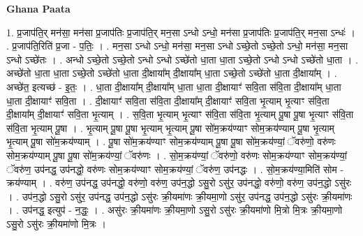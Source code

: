 \documentclass[17pt]{extarticle}
\begin{document}
\textbf{Ghana Paata } \newline

1. प्र॒जाप॑ति॒र् मन॑सा॒ मन॑सा प्र॒जाप॑तिः प्र॒जाप॑ति॒र् मन॒सा ऽन्धो ऽन्धो॒ मन॑सा प्र॒जाप॑तिः प्र॒जाप॑ति॒र् मन॒सा ऽन्धः॑ । . प्र॒जाप॑ति॒रिति॑ प्र॒जा - प॒तिः॒ । . मन॒सा ऽन्धो ऽन्धो॒ मन॑सा॒ मन॒सा ऽन्धो ऽच्छे॒तो ऽच्छे॒तो ऽन्धो॒ मन॑सा॒ मन॒सा ऽन्धो ऽच्छे॑तः । . अन्धो ऽच्छे॒तो ऽच्छे॒तो ऽन्धो ऽन्धो ऽच्छे॑तो धा॒ता धा॒ता ऽच्छे॒तो ऽन्धो ऽन्धो ऽच्छे॑तो धा॒ता । . अच्छे॑तो धा॒ता धा॒ता ऽच्छे॒तो ऽच्छे॑तो धा॒ता दी॒क्षाया᳚म् दी॒क्षाया᳚म् धा॒ता ऽच्छे॒तो ऽच्छे॑तो धा॒ता दी॒क्षाया᳚म् । . अच्छे॑त॒ इत्यच्छ॑ - इ॒तः॒ । . धा॒ता दी॒क्षाया᳚म् दी॒क्षाया᳚म् धा॒ता धा॒ता दी॒क्षायाꣳ॑ सवि॒ता स॑वि॒ता दी॒क्षाया᳚म् धा॒ता धा॒ता दी॒क्षायाꣳ॑ सवि॒ता । . दी॒क्षायाꣳ॑ सवि॒ता स॑वि॒ता दी॒क्षाया᳚म् दी॒क्षायाꣳ॑ सवि॒ता भृ॒त्याम् भृ॒त्याꣳ स॑वि॒ता दी॒क्षाया᳚म् दी॒क्षायाꣳ॑ सवि॒ता भृ॒त्याम् । . स॒वि॒ता भृ॒त्याम् भृ॒त्याꣳ स॑वि॒ता स॑वि॒ता भृ॒त्याम् पू॒षा पू॒षा भृ॒त्याꣳ स॑वि॒ता स॑वि॒ता भृ॒त्याम् पू॒षा । . भृ॒त्याम् पू॒षा पू॒षा भृ॒त्याम् भृ॒त्याम् पू॒षा सो॑म॒क्रय॑ण्याꣳ सोम॒क्रय॑ण्याम् पू॒षा भृ॒त्याम् भृ॒त्याम् पू॒षा सो॑म॒क्रय॑ण्याम् । . पू॒षा सो॑म॒क्रय॑ण्याꣳ सोम॒क्रय॑ण्याम् पू॒षा पू॒षा सो॑म॒क्रय॑ण्यां॒ ॅवरु॑णो॒ वरु॑णः सोम॒क्रय॑ण्याम् पू॒षा पू॒षा सो॑म॒क्रय॑ण्यां॒ ॅवरु॑णः । . सो॒म॒क्रय॑ण्यां॒ ॅवरु॑णो॒ वरु॑णः सोम॒क्रय॑ण्याꣳ सोम॒क्रय॑ण्यां॒ ॅवरु॑ण॒ उप॑नद्ध॒ उप॑नद्धो॒ वरु॑णः सोम॒क्रय॑ण्याꣳ सोम॒क्रय॑ण्यां॒ ॅवरु॑ण॒ उप॑नद्धः । . सो॒म॒क्रय॑ण्या॒मिति॑ सोम - क्रय॑ण्याम् । . वरु॑ण॒ उप॑नद्ध॒ उप॑नद्धो॒ वरु॑णो॒ वरु॑ण॒ उप॑न॒द्धो ऽसु॒रो ऽसु॑र॒ उप॑नद्धो॒ वरु॑णो॒ वरु॑ण॒ उप॑न॒द्धो ऽसु॑रः । . उप॑न॒द्धो ऽसु॒रो ऽसु॑र॒ उप॑नद्ध॒ उप॑न॒द्धो ऽसु॑रः क्री॒यमा॑णः क्री॒यमा॒णो ऽसु॑र॒ उप॑नद्ध॒ उप॑न॒द्धो ऽसु॑रः क्री॒यमा॑णः । . उप॑नद्ध॒ इत्युप॑ - न॒द्धः॒ । . असु॑रः क्री॒यमा॑णः क्री॒यमा॒णो ऽसु॒रो ऽसु॑रः क्री॒यमा॑णो मि॒त्रो मि॒त्रः क्री॒यमा॒णो ऽसु॒रो ऽसु॑रः क्री॒यमा॑णो मि॒त्रः । \newline
\end{document}
